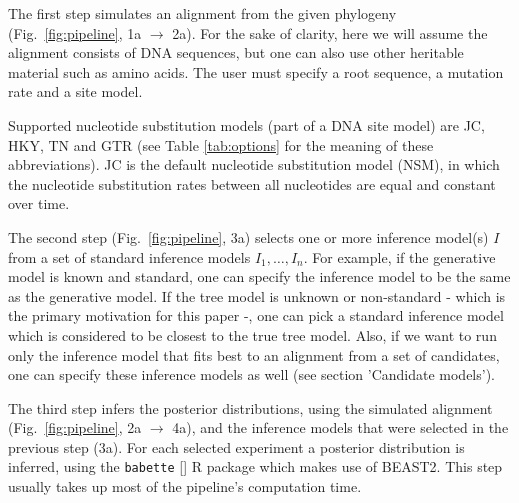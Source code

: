 The first step simulates an alignment from the given 
phylogeny (Fig.~\ref{fig:pipeline}, 1a $\rightarrow$ 2a).
For the sake of clarity, here we will assume the alignment consists
of DNA sequences, but one can also use other heritable material such as amino acids.
The user must specify a root sequence, a mutation rate and a site model.

{}
Supported nucleotide substitution models (part of a DNA
site model) are JC, HKY, TN and GTR (see Table \ref{tab:options} for
the meaning of these abbreviations).
JC is the default nucleotide substitution model (NSM),
in which the nucleotide substitution rates between all
nucleotides are equal and constant over time.

The second step (Fig.~\ref{fig:pipeline}, 3a)
selects one or more inference model(s) $I$ from 
a set of standard inference models $I_{1},\dots,I_{n}$.
For example, if the generative model is known and standard,
one can specify the inference model to be the same as the generative model.
If the tree model is unknown or non-standard - which is the primary 
motivation for this paper -, one can pick
a standard inference model which is considered 
to be closest to the true tree model.
Also, if we want to run only the inference
model that fits best to an alignment from a set of candidates,
one can specify these inference models as 
well (see section 'Candidate models').

The third step infers the posterior distributions,
using the simulated alignment (Fig.~\ref{fig:pipeline}, 2a $\rightarrow$ 4a),
and the inference models that were selected in the previous step (3a). 
For each selected experiment a posterior distribution is inferred, using the 
\verb;babette; [\cite{bilderbeek2018babette}] R package which makes use of BEAST2. 
This step usually takes up most of the pipeline's computation time.

